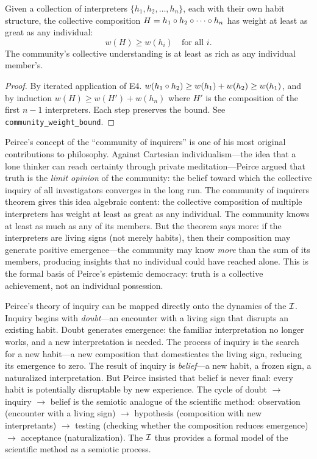 \begin{theorem}
\label{thm:community-inquirers}
Given a collection of interpreters $\{h_1, h_2, \ldots, h_n\}$, each with their own habit structure, the collective composition $H = h_1 \circ h_2 \circ \cdots \circ h_n$ has weight at least as great as any individual:
\[
  w(H) \geq w(h_i) \quad \text{for all } i.
\]
The community's collective understanding is at least as rich as any individual member's.
\end{theorem}

\begin{proof}
By iterated application of E4. $w(h_1 \circ h_2) \geq w(h_1) + w(h_2) \geq w(h_1)$, and by induction $w(H) \geq w(H') + w(h_n)$ where $H'$ is the composition of the first $n-1$ interpreters. Each step preserves the bound. See \texttt{community\_weight\_bound}.
\end{proof}

\begin{interpretation}
Peirce's concept of the ``community of inquirers'' is one of his most original contributions to philosophy. Against Cartesian individualism---the idea that a lone thinker can reach certainty through private meditation---Peirce argued that truth is the \emph{limit opinion} of the community: the belief toward which the collective inquiry of all investigators converges in the long run. The community of inquirers theorem gives this idea algebraic content: the collective composition of multiple interpreters has weight at least as great as any individual. The community knows at least as much as any of its members. But the theorem says more: if the interpreters are living signs (not merely habits), then their composition may generate positive emergence---the community may know \emph{more} than the sum of its members, producing insights that no individual could have reached alone. This is the formal basis of Peirce's epistemic democracy: truth is a collective achievement, not an individual possession.
\end{interpretation}

\begin{remark}
Peirce's theory of inquiry can be mapped directly onto the dynamics of the $\mathcal{I}$. Inquiry begins with \emph{doubt}---an encounter with a living sign that disrupts an existing habit. Doubt generates emergence: the familiar interpretation no longer works, and a new interpretation is needed. The process of inquiry is the search for a new habit---a new composition that domesticates the living sign, reducing its emergence to zero. The result of inquiry is \emph{belief}---a new habit, a frozen sign, a naturalized interpretation. But Peirce insisted that belief is never final: every habit is potentially disruptable by new experience. The cycle of doubt $\to$ inquiry $\to$ belief is the semiotic analogue of the scientific method: observation (encounter with a living sign) $\to$ hypothesis (composition with new interpretants) $\to$ testing (checking whether the composition reduces emergence) $\to$ acceptance (naturalization). The $\mathcal{I}$ thus provides a formal model of the scientific method as a semiotic process.
\end{remark}

